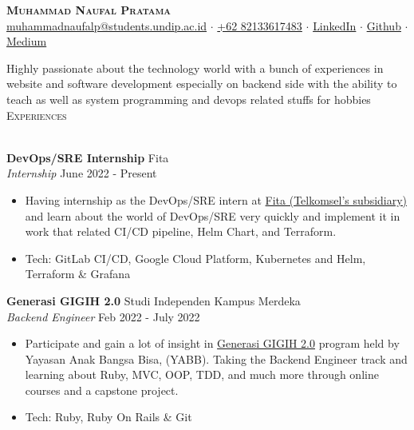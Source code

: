 \documentclass[a4paper]{article}
\newcommand{\lineunder} {
    \vspace*{-8pt} \\
    \hspace*{-18pt} \hrulefill \\
}
\newcommand{\header} [1] {
    {\hspace*{-18pt}\vspace*{6pt} \textsc{#1}}
    \vspace*{-6pt} \lineunder
}
\begin{document}
\vspace*{-40pt}

\vspace*{-10pt}
\begin{center}
	{\Huge \scshape \textbf{Muhammad Naufal Pratama}}\\
	\href{mailto:muhammadnaufalp@students.undip.ac.id}{muhammadnaufalp@students.undip.ac.id} $\cdot$ \href{https://wa.me/6282133617483}{+62 82133617483} $\cdot$ \href{https://linkedin.com/in/mnpratamaa}{LinkedIn} $\cdot$ \href{https://github.com/mhnaufal}{Github} $\cdot$ \href{mprtmma.medium.com}{Medium}\\
\end{center}

Highly passionate about the technology world with a bunch of experiences in website and software development especially on backend side with the ability to teach as well as system programming and devops related stuffs for hobbies\\

\header{Experiences}
\vspace{1mm}

\textbf{DevOps/SRE Internship} \hfill Fita\\
\textit{Internship} \hfill June 2022 - Present\\
\vspace{-1mm}
\begin{itemize} \itemsep 1pt
	\item Having internship as the DevOps/SRE intern at \href{https://fita.co.id/}{Fita (Telkomsel's subsidiary)} and learn about the world of DevOps/SRE very quickly and implement it in work that related CI/CD pipeline, Helm Chart, and Terraform.
	\item Tech: GitLab CI/CD, Google Cloud Platform, Kubernetes and Helm, Terraform \& Grafana
\end{itemize}

\textbf{Generasi GIGIH 2.0} \hfill Studi Independen Kampus Merdeka \\
\textit{Backend Engineer} \hfill Feb 2022 - July 2022\\
\vspace{-1mm}
\begin{itemize} \itemsep 1pt
	\item Participate and gain a lot of insight in \href{https://www.anakbangsabisa.org/generasi-gigih/}{Generasi GIGIH 2.0} program held by Yayasan Anak Bangsa Bisa, (YABB). Taking the Backend Engineer track and learning about Ruby, MVC, OOP, TDD, and much more through online courses and a capstone project.
	\item Tech: Ruby, Ruby On Rails \& Git
\end{itemize}
\end{document}

